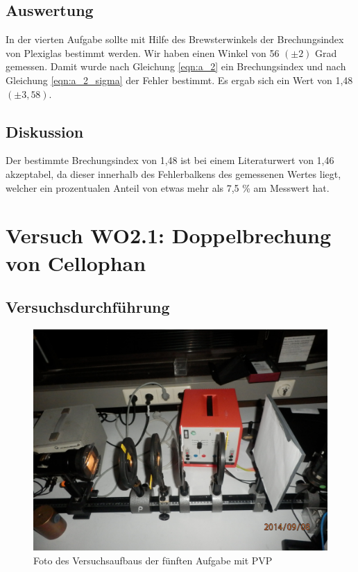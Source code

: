 \documentclass[12pt]{scrartcl}
\begin{document}
\subsection{Auswertung}
In der vierten Aufgabe sollte mit Hilfe des Brewsterwinkels der Brechungsindex von Plexiglas bestimmt werden. Wir haben einen Winkel von 56 $(\pm 2)$ Grad gemessen. Damit wurde nach Gleichung \ref{eqn:a_2} ein Brechungsindex und nach Gleichung \ref{eqn:a_2_sigma} der Fehler bestimmt. Es ergab sich ein Wert von 1,48 $(\pm3,58)$.
\subsection{Diskussion}
Der bestimmte Brechungsindex von 1,48 ist bei einem Literaturwert von 1,46 akzeptabel, da dieser innerhalb des Fehlerbalkens des gemessenen Wertes liegt, welcher ein prozentualen Anteil von etwas mehr als 7,5 \% am Messwert hat.

\section{Versuch WO2.1:
Doppelbrechung von Cellophan}
\subsection{Versuchsdurchführung}

\begin{figure}[H]
\centering
    \includegraphics[scale = 0.1]{aufgabe_5_1.JPG}
  	\caption[Foto des Versuchsaufbaus der fünften Aufgabe mit PVP]{Foto des Versuchsaufbaus der fünften Aufgabe mit PVP}
  \label{fig:aufgabe_5_1}
\end{figure}
\end{document}
